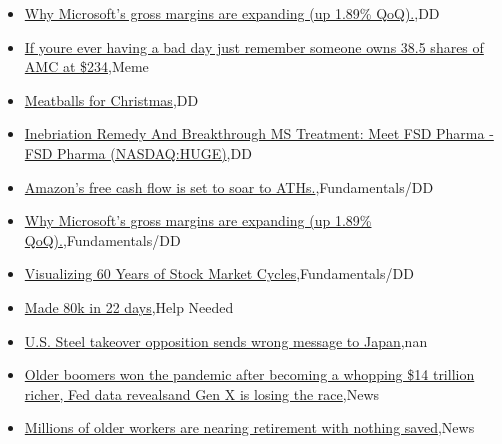 \documentclass{article}%
\begin{document}
%
\begin{itemize}%
\item%
\href{https://reddit.com/r/wallstreetbets/comments/18p3r0i/why\_microsofts\_gross\_margins\_are\_expanding\_up\_189/}{Why Microsoft's gross margins are expanding (up 1.89\% QoQ).},DD%
\item%
\href{https://reddit.com/r/wallstreetbets/comments/18p0mmo/if\_youre\_ever\_having\_a\_bad\_day\_just\_remember/}{If youre ever having a bad day just remember someone owns 38.5 shares of AMC at \$234},Meme%
\item%
\href{https://reddit.com/r/wallstreetbets/comments/18p08g3/meatballs\_for\_christmas/}{Meatballs for Christmas},DD%
\item%
\href{https://reddit.com/r/Baystreetbets/comments/18ohc75/inebriation\_remedy\_and\_breakthrough\_ms\_treatment/}{Inebriation Remedy And Breakthrough MS Treatment: Meet FSD Pharma - FSD Pharma (NASDAQ:HUGE)},DD%
\item%
\href{https://reddit.com/r/StockMarket/comments/18p3wxf/amazons\_free\_cash\_flow\_is\_set\_to\_soar\_to\_aths/}{Amazon's free cash flow is set to soar to ATHs.},Fundamentals/DD%
\item%
\href{https://reddit.com/r/StockMarket/comments/18p3qby/why\_microsofts\_gross\_margins\_are\_expanding\_up\_189/}{Why Microsoft's gross margins are expanding (up 1.89\% QoQ).},Fundamentals/DD%
\item%
\href{https://reddit.com/r/StockMarket/comments/18ozq64/visualizing\_60\_years\_of\_stock\_market\_cycles/}{Visualizing 60 Years of Stock Market Cycles},Fundamentals/DD%
\item%
\href{https://reddit.com/r/StockMarket/comments/18oycp6/made\_80k\_in\_22\_days/}{Made 80k in 22 days},Help Needed%
\item%
\href{https://reddit.com/r/Economics/comments/18oougc/us\_steel\_takeover\_opposition\_sends\_wrong\_message/}{U.S. Steel takeover opposition sends wrong message to Japan},nan%
\item%
\href{https://reddit.com/r/Economics/comments/18ooifz/older\_boomers\_won\_the\_pandemic\_after\_becoming\_a/}{Older boomers won the pandemic after becoming a whopping \$14 trillion richer, Fed data revealsand Gen X is losing the race},News%
\item%
\href{https://reddit.com/r/Economics/comments/18ok63p/millions\_of\_older\_workers\_are\_nearing\_retirement/}{Millions of older workers are nearing retirement with nothing saved},News%
\end{itemize}%
\end{document}
